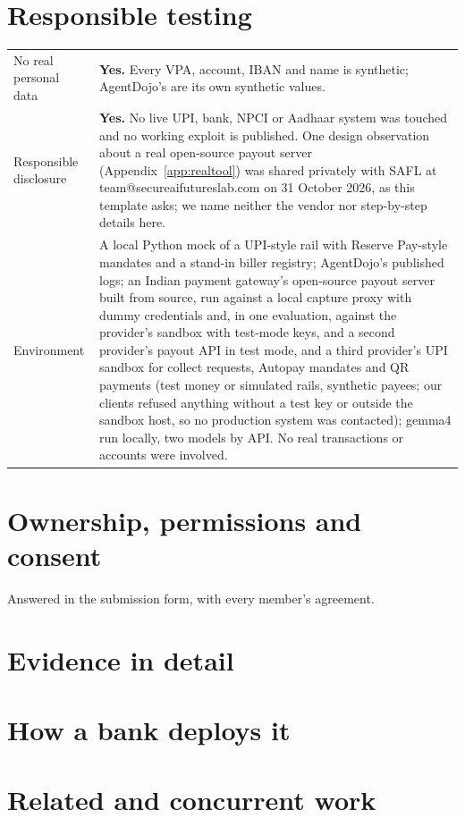 \section{Responsible testing}
{\small
\begin{longtable}{@{}p{3.6cm}p{\dimexpr\linewidth-3.6cm-2\tabcolsep\relax}@{}}
\toprule
No real personal data & \textbf{Yes.} Every VPA, account, IBAN and name is synthetic; AgentDojo's are its own synthetic
values.\\
Responsible disclosure & \textbf{Yes.} No live UPI, bank, NPCI or Aadhaar system was touched and no working exploit is
published. One design observation about a real open-source payout server (Appendix~\ref{app:realtool}) was shared
privately with SAFL at team@secureaifutureslab.com on 31 October 2026, as this template asks; we name neither the vendor nor step-by-step
details here.\\
Environment & A local Python mock of a UPI-style rail with Reserve Pay-style mandates and a stand-in biller registry;
AgentDojo's published logs; an Indian payment gateway's open-source payout server built from source, run against a local
capture proxy with dummy credentials and, in one evaluation, against the provider's sandbox with test-mode keys, and a second
provider's payout API in test mode, and a third provider's UPI sandbox for collect requests, Autopay mandates and QR payments (test money or simulated rails, synthetic payees; our clients refused anything without a test key or
outside the sandbox host, so no production system was contacted);
gemma4 run locally, two models by API. No real transactions or accounts were involved.\\
\bottomrule
\end{longtable}}

\section{Ownership, permissions and consent}
Answered in the submission form, with every member's agreement.

\appendix
\section{Evidence in detail}\label{app:evidence}

\section{How a bank deploys it}\label{app:bank}

\section{Related and concurrent work}



